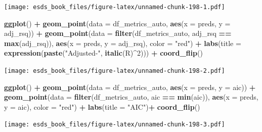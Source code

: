 \documentclass[
]{book}
\newenvironment{Shaded}{\begin{snugshade}}{\end{snugshade}}
\newcommand{\DataTypeTok}[1]{\textcolor[rgb]{0.13,0.29,0.53}{#1}}
\newcommand{\DecValTok}[1]{\textcolor[rgb]{0.00,0.00,0.81}{#1}}
\newcommand{\KeywordTok}[1]{\textcolor[rgb]{0.13,0.29,0.53}{\textbf{#1}}}
\newcommand{\NormalTok}[1]{#1}
\newcommand{\OperatorTok}[1]{\textcolor[rgb]{0.81,0.36,0.00}{\textbf{#1}}}
\newcommand{\StringTok}[1]{\textcolor[rgb]{0.31,0.60,0.02}{#1}}
\begin{document}
\texttt{[image: esds\_book\_files/figure-latex/unnamed-chunk-198-1.pdf]}

\begin{Shaded}
\begin{Highlighting}[]
\KeywordTok{ggplot}\NormalTok{() }\OperatorTok{+}
\StringTok{  }\KeywordTok{geom_point}\NormalTok{(}\DataTypeTok{data =}\NormalTok{ df_metrics_auto, }\KeywordTok{aes}\NormalTok{(}\DataTypeTok{x =}\NormalTok{ preds, }\DataTypeTok{y =}\NormalTok{ adj_rsq)) }\OperatorTok{+}
\StringTok{  }\KeywordTok{geom_point}\NormalTok{(}\DataTypeTok{data =} \KeywordTok{filter}\NormalTok{(df_metrics_auto, adj_rsq }\OperatorTok{==}\StringTok{ }\KeywordTok{max}\NormalTok{(adj_rsq)), }\KeywordTok{aes}\NormalTok{(}\DataTypeTok{x =}\NormalTok{ preds, }\DataTypeTok{y =}\NormalTok{ adj_rsq), }\DataTypeTok{color =} \StringTok{"red"}\NormalTok{) }\OperatorTok{+}
\StringTok{  }\KeywordTok{labs}\NormalTok{(}\DataTypeTok{title =} \KeywordTok{expression}\NormalTok{(}\KeywordTok{paste}\NormalTok{(}\StringTok{"Adjusted-"}\NormalTok{, }\KeywordTok{italic}\NormalTok{(R)}\OperatorTok{^}\DecValTok{2}\NormalTok{))) }\OperatorTok{+}\StringTok{ }
\StringTok{  }\KeywordTok{coord_flip}\NormalTok{()}
\end{Highlighting}
\end{Shaded}

\texttt{[image: esds\_book\_files/figure-latex/unnamed-chunk-198-2.pdf]}

\begin{Shaded}
\begin{Highlighting}[]
\KeywordTok{ggplot}\NormalTok{() }\OperatorTok{+}
\StringTok{  }\KeywordTok{geom_point}\NormalTok{(}\DataTypeTok{data =}\NormalTok{ df_metrics_auto, }\KeywordTok{aes}\NormalTok{(}\DataTypeTok{x =}\NormalTok{ preds, }\DataTypeTok{y =}\NormalTok{ aic)) }\OperatorTok{+}
\StringTok{  }\KeywordTok{geom_point}\NormalTok{(}\DataTypeTok{data =} \KeywordTok{filter}\NormalTok{(df_metrics_auto, aic }\OperatorTok{==}\StringTok{ }\KeywordTok{min}\NormalTok{(aic)), }\KeywordTok{aes}\NormalTok{(}\DataTypeTok{x =}\NormalTok{ preds, }\DataTypeTok{y =}\NormalTok{ aic), }\DataTypeTok{color =} \StringTok{"red"}\NormalTok{) }\OperatorTok{+}
\StringTok{  }\KeywordTok{labs}\NormalTok{(}\DataTypeTok{title =} \StringTok{"AIC"}\NormalTok{)}\OperatorTok{+}\StringTok{ }
\StringTok{  }\KeywordTok{coord_flip}\NormalTok{()}
\end{Highlighting}
\end{Shaded}

\texttt{[image: esds\_book\_files/figure-latex/unnamed-chunk-198-3.pdf]}
\end{document}

